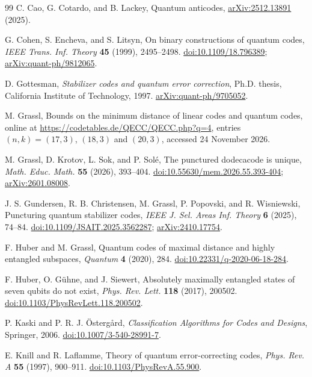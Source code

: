 \documentclass[11pt]{article}
\theoremstyle{definition}
\theoremstyle{remark}
\begin{document}
\begin{thebibliography}{99}
C. Cao, G. Cotardo, and B. Lackey, Quantum anticodes,
\href{https://arxiv.org/abs/2512.13891}{arXiv:2512.13891} (2025).

G. Cohen, S. Encheva, and S. Litsyn,
On binary constructions of quantum codes,
\emph{IEEE Trans. Inf. Theory} \textbf{45} (1999), 2495--2498.
\href{https://doi.org/10.1109/18.796389}{doi:10.1109/18.796389};
\href{https://arxiv.org/abs/quant-ph/9812065}{arXiv:quant-ph/9812065}.

D. Gottesman, \emph{Stabilizer codes and quantum error correction},
Ph.D. thesis, California Institute of Technology, 1997.
\href{https://arxiv.org/abs/quant-ph/9705052}{arXiv:quant-ph/9705052}.

M. Grassl, Bounds on the minimum distance of linear codes and quantum
codes, online at \url{https://codetables.de/QECC/QECC.php?q=4}, entries
\((n,k)=(17,3)\), \((18,3)\) and \((20,3)\), accessed 24 November 2026.

M. Grassl, D. Krotov, L. Sok, and P. Sol\'e,
The punctured dodecacode is unique,
\emph{Math. Educ. Math.} \textbf{55} (2026), 393--404.
\href{https://doi.org/10.55630/mem.2026.55.393-404}{doi:10.55630/mem.2026.55.393-404};
\href{https://arxiv.org/abs/2601.08008}{arXiv:2601.08008}.

J. S. Gundersen, R. B. Christensen, M. Grassl, P. Popovski, and
R. Wisniewski, Puncturing quantum stabilizer codes,
\emph{IEEE J. Sel. Areas Inf. Theory} \textbf{6} (2025), 74--84.
\href{https://doi.org/10.1109/JSAIT.2025.3562287}{doi:10.1109/JSAIT.2025.3562287};
\href{https://arxiv.org/abs/2410.17754}{arXiv:2410.17754}.

F. Huber and M. Grassl,
Quantum codes of maximal distance and highly entangled subspaces,
\emph{Quantum} \textbf{4} (2020), 284.
\href{https://doi.org/10.22331/q-2020-06-18-284}{doi:10.22331/q-2020-06-18-284}.

F. Huber, O. G\"uhne, and J. Siewert,
Absolutely maximally entangled states of seven qubits do not exist,
\emph{Phys. Rev. Lett.} \textbf{118} (2017), 200502.
\href{https://doi.org/10.1103/PhysRevLett.118.200502}{doi:10.1103/PhysRevLett.118.200502}.

P. Kaski and P. R. J. \"Osterg\aa rd,
\emph{Classification Algorithms for Codes and Designs},
Springer, 2006.
\href{https://doi.org/10.1007/3-540-28991-7}{doi:10.1007/3-540-28991-7}.

E. Knill and R. Laflamme,
Theory of quantum error-correcting codes,
\emph{Phys. Rev. A} \textbf{55} (1997), 900--911.
\href{https://doi.org/10.1103/PhysRevA.55.900}{doi:10.1103/PhysRevA.55.900}.


\end{thebibliography}
\end{document}
